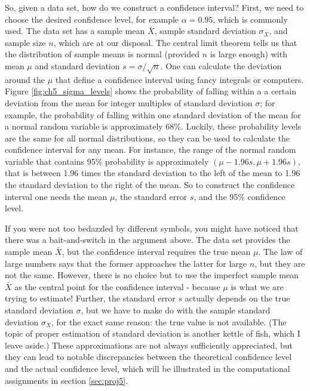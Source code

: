 \documentclass[
  letterpaper,
  DIV=11,
  numbers=noendperiod]{scrreprt}
\begin{document}
So, given a data set, how do we construct a confidence interval? First,
we need to choose the desired confidence level, for example
\(\alpha=0.95\), which is commonly used. The data set has a sample mean
\(\bar X\), sample standard deviation \(\sigma_X\), and sample size
\(n\), which are at our disposal. The central limit theorem tells us
that the distribution of sample means is normal (provided \(n\) is large
enough) with mean \(\mu\) and standard deviation \(s=\sigma/\sqrt n\).
One can calculate the deviation around the \(\mu\) that define a
confidence interval using fancy integrals or computers. Figure
\ref{fig:ch5_sigma_levels} shows the probability of falling within a a
certain deviation from the mean for integer multiples of standard
deviation \(\sigma\); for example, the probability of falling within one
standard deviation of the mean for a normal random variable is
approximately 68\%. Luckily, these probability levels are the same for
all normal distributions, so they can be used to calculate the
confidence interval for any mean. For instance, the range of the normal
random variable that contains 95\% probability is approximately
\((\mu - 1.96 s, \mu + 1.96 s)\), that is between 1.96 times the
standard deviation to the left of the mean to 1.96 the standard
deviation to the right of the mean. So to construct the confidence
interval one needs the mean \(\mu\), the standard error \(s\), and the
95\% confidence level.

If you were not too bedazzled by different symbols, you might have
noticed that there was a bait-and-switch in the argument above. The data
set provides the sample mean \(\bar X\), but the confidence interval
requires the true mean \(\mu\). The law of large numbers says that the
former approaches the latter for large \(n\), but they are not the same.
However, there is no choice but to use the imperfect sample mean
\(\bar X\) as the central point for the confidence interval - because
\(\mu\) is what we are trying to estimate! Further, the standard error
\(s\) actually depends on the true standard deviation \(\sigma\), but we
have to make do with the sample standard deviation \(\sigma_X\), for the
exact same reason: the true value is not available. (The topic of proper
estimation of standard deviation is another kettle of fish, which I
leave aside.) These approximations are not always sufficiently
appreciated, but they can lead to notable discrepancies between the
theoretical confidence level and the actual confidence level, which will
be illustrated in the computational assignments in section
\ref{sec:proj5}.
\end{document}
